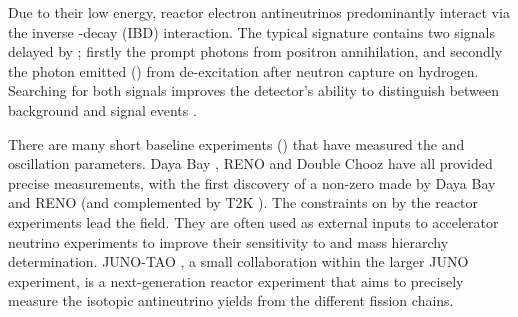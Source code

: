 Due to their low energy, reactor electron antineutrinos predominantly interact via the inverse \quickmath{\beta}-decay (IBD) interaction. The typical signature contains two signals delayed by ; firstly the prompt photons from positron annihilation, and secondly the photon emitted () from de-excitation after neutron capture on hydrogen. Searching for both signals improves the detector's ability to distinguish between background and signal events \cite{Abe2022-ij}. %

There are many short baseline experiments () that have measured the  and  oscillation parameters. Daya Bay \cite{PhysRevLett.108.171803}, RENO \cite{PhysRevLett.108.191802} and Double Chooz \cite{PhysRevLett.108.131801} have all provided precise measurements, with the first discovery of a non-zero  made by Daya Bay and RENO (and complemented by T2K \cite{PhysRevLett.108.131801}). The constraints on  by the reactor experiments lead the field. They are often used as external inputs to accelerator neutrino experiments to improve their sensitivity to  and mass hierarchy determination.
JUNO-TAO \cite{junocollaboration2020tao}, a small collaboration within the larger JUNO experiment, is a next-generation reactor experiment that aims to precisely measure the isotopic antineutrino yields from the different fission chains. %

